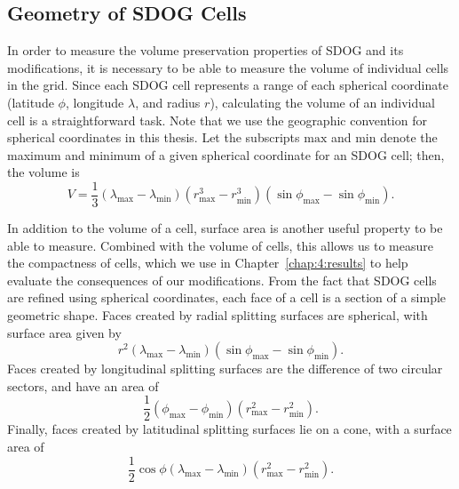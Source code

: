 \subsection{Geometry of SDOG Cells} \label{chap:4:geom}
In order to measure the volume preservation properties of SDOG and its modifications, it is necessary to be able to measure the volume of individual cells in the grid.
Since each SDOG cell represents a range of each spherical coordinate (latitude $\phi$, longitude $\lambda$, and radius $r$), calculating the volume of an individual cell is a straightforward task.
Note that we use the geographic convention for spherical coordinates in this thesis.
Let the subscripts $\mathrm{max}$ and $\mathrm{min}$ denote the maximum and minimum of a given spherical coordinate for an SDOG cell; then, the volume is \cite{yu2009sdog}
%
\begin{equation} \label{eq:volume}
V = \frac{1}{3} \left( \lambda_\mathrm{max} - \lambda_\mathrm{min} \right) \left(r_\mathrm{max}^{3} - r_\mathrm{min}^{3} \right) \left(\sin\phi_\mathrm{max} - \sin\phi_\mathrm{min} \right).
\end{equation}


In addition to the volume of a cell, surface area is another useful property to be able to measure.
Combined with the volume of cells, this allows us to measure the compactness of cells, which we use in Chapter~\ref{chap:4:results} to help evaluate the consequences of our modifications.
From the fact that SDOG cells are refined using spherical coordinates, each face of a cell is a section of a simple geometric shape.
Faces created by radial splitting surfaces are spherical, with surface area given by
%
\begin{equation*}
r^2 \left( \lambda_\mathrm{max} - \lambda_\mathrm{min} \right) \left( \sin\phi_\mathrm{max} - \sin\phi_\mathrm{min} \right).
\end{equation*}
%
Faces created by longitudinal splitting surfaces are the difference of two circular sectors, and have an area of
%
\begin{equation*}
\frac{1}{2} \left( \phi_\mathrm{max} - \phi_\mathrm{min} \right) \left( r_\mathrm{max}^{2} - r_\mathrm{min}^{2} \right).
\end{equation*}
%
Finally, faces created by latitudinal splitting surfaces lie on a cone, with a surface area of
%
\begin{equation*}
\frac{1}{2} \cos\phi \left( \lambda_\mathrm{max} - \lambda_\mathrm{min} \right) \left( r_\mathrm{max}^{2} - r_\mathrm{min}^{2} \right).
\end{equation*}


